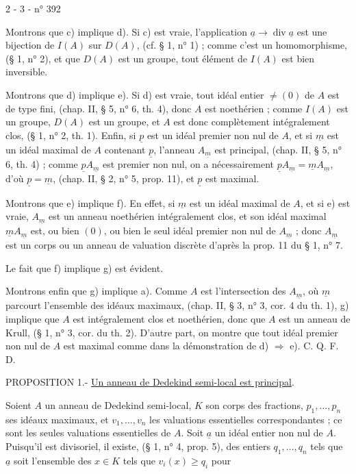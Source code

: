 2 - 3 - \hfill n° 392

Montrons que c) implique d). Si c) est vraie, l'application $\underline a\longrightarrow\operatorname{div}\underline a$ est une bijection de $I(A)$ sur $D(A)$, (cf. § 1, n° 1) ; comme c'est un homomorphisme, (§ 1, n° 2), et que $D(A)$ est un groupe, tout élément de $I(A)$ est bien inversible.

Montrons que d) implique e). Si d) est vraie, tout idéal entier $\ne(0)$ de $A$ est de type fini, (chap. II, § 5, n° 6, th. 4), donc $A$ est noethérien ; comme $I(A)$ est un groupe, $D(A)$ est un groupe, et $A$ est donc complètement intégralement clos, (§ 1, n° 2, th. 1). Enfin, si $\underline p$ est un idéal premier non nul de $A$, et si $\underline m$ est un idéal maximal de $A$ contenant $\underline p$, l'anneau $A_{\underline m}$ est principal, (chap. II, § 5, n° 6, th. 4) ; comme $\underline pA_{\underline m}$ est premier non nul, on a nécessairement $\underline pA_{\underline m}=\underline mA_{\underline m}$, d'où $\underline p=\underline m$, (chap. II, § 2, n° 5, prop. 11), et $\underline p$ est maximal.

Montrons que e) implique f). En effet, si $\underline m$ est un idéal maximal de $A$, et si e) est vraie, $A_{\underline m}$ est un anneau noethérien intégralement clos, et son idéal maximal $\underline mA_{\underline m}$ est, ou bien $(0)$, ou bien le seul idéal premier non nul de $A_{\underline m}$ ; donc $A_{\underline m}$ est un corps ou un anneau de valuation discrète d'après la prop. 11 du § 1, n° 7.

Le fait que f) implique g) est évident.

Montrons enfin que g) implique a). Comme $A$ est l'intersection des $A_{\underline m}$, où $\underline m$ parcourt l'ensemble des idéaux maximaux, (chap. II, § 3, n° 3, cor. 4 du th. 1), g) implique que $A$ est intégralement clos et noethérien, donc que $A$ est un anneau de Krull, (§ 1, n° 3, cor. du th. 2). D'autre part, on montre que tout idéal premier non nul de $A$ est maximal comme dans la démonstration de d) $\Longrightarrow$ e). C. Q. F. D.

PROPOSITION 1.- \uline{Un anneau de Dedekind semi-local est principal}.

Soient $A$ un anneau de Dedekind semi-local, $K$ son corps des fractions, $p_1,\ldots,p_n$ ses idéaux maximaux, et $v_1,\ldots,v_n$ les valuations essentielles correspondantes ; ce sont les seules valuations essentielles de $A$. Soit $\underline a$ un idéal entier non nul de $A$. Puisqu'il est divisoriel, il existe, (§ 1, n° 4, prop. 5), des entiers $q_1,\ldots,q_n$ tels que $\underline a$ soit l'ensemble des $x\in K$ tels que $v_i(x)\ge q_i$ pour
